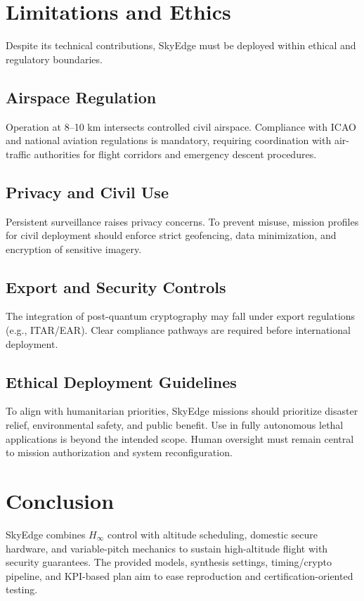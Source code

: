 \documentclass[conference]{IEEEtran}
\begin{document}
\section{Limitations and Ethics}
Despite its technical contributions, SkyEdge must be deployed within
ethical and regulatory boundaries.  

\subsection{Airspace Regulation}
Operation at 8--10 km intersects controlled civil airspace. Compliance
with ICAO and national aviation regulations is mandatory, requiring
coordination with air-traffic authorities for flight corridors and
emergency descent procedures.  

\subsection{Privacy and Civil Use}
Persistent surveillance raises privacy concerns. To prevent misuse,
mission profiles for civil deployment should enforce strict geofencing,
data minimization, and encryption of sensitive imagery.  

\subsection{Export and Security Controls}
The integration of post-quantum cryptography may fall under export
regulations (e.g., ITAR/EAR). Clear compliance pathways are required
before international deployment.  

\subsection{Ethical Deployment Guidelines}
To align with humanitarian priorities, SkyEdge missions should
prioritize disaster relief, environmental safety, and public benefit.
Use in fully autonomous lethal applications is beyond the intended
scope. Human oversight must remain central to mission authorization and
system reconfiguration.  

\section{Conclusion}
SkyEdge combines $H_\infty$ control with altitude scheduling, domestic secure hardware, and variable-pitch mechanics to sustain high-altitude flight with security guarantees. The provided models, synthesis settings, timing/crypto pipeline, and KPI-based plan aim to ease reproduction and certification-oriented testing.
\end{document}
